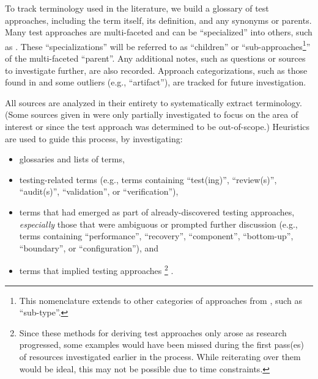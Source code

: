 To track terminology used in the literature, we build a glossary of test
approaches, including the term itself, its definition, and
any synonyms or parents. Many test approaches are multi-faceted and can be
``specialized'' into others, such as . These
``specializations'' will be referred to as ``children'' or
``sub-approaches\footnote{This nomenclature extends to other categories of
      approaches from , such as ``sub-type''.}''
of the multi-faceted
``parent''. Any additional notes, such as questions or sources to investigate
further, are also recorded. Approach categorizations, such as those found in
 and some outliers (e.g., ``artifact''), are tracked
for future investigation.

All sources are analyzed in their entirety to systematically extract
terminology. (Some sources given in 
were only partially investigated to focus on the area of interest or since
the test approach was determined to be out-of-scope.)
Heuristics are used to guide this process, by investigating:

\begin{itemize}
      \item glossaries and lists of terms,
      \item testing-related terms (e.g., terms containing ``test(ing)'',
            \ifnotpaper ``review(s)'', ``audit(s)'', \fi
            ``validation'', or ``verification''),
      \item terms that had emerged as part of already-discovered
            testing approaches, \emph{especially} those that were ambiguous
            or prompted further discussion (e.g., terms containing
            ``performance'', ``recovery'', ``component'', ``bottom-up'',
            \ifnotpaper ``boundary'', \fi or ``configuration''), and
      \item terms that implied testing approaches%
            \ifnotpaper\footnote{
                        Since these methods for deriving test approaches only arose
                        as research progressed, some examples would have been missed
                        during the first pass(es) of resources investigated earlier
                        in the process. While reiterating over them would be ideal,
                        this may not be possible due to time constraints.
                  }\fi%
            .
\end{itemize}


